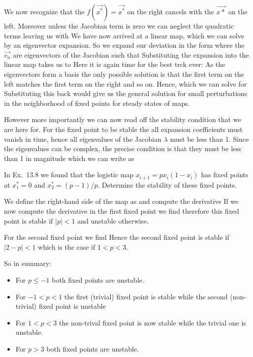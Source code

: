 We now recognize that the $f(\vec{x^*})=\vec{x^*}$ on the right cancels with the $\vec{x*}$ on the left. Moreover unless the Jacobian term is zero we can neglect the quadratic terms leaving us with  
We have now arrived at a linear map, which we can solve by an eigenvector expansion. So we expand our deviation in the form 
where the $\vec{v_n}$ are eigenvectors of the Jacobian such that 
Substituting the expansion into the linear map takes us to 
Here it is again time for the best trck ever: As the eigenvectors form a basis the only possible solution is that the first term on the left matches the first term on the right and so on. Hence,
which we can solve for 
Substituting this back would give us the general solution for small perturbations in the neighborhood of fixed points for steady states of maps. 

However more importantly we can now read off the stability condition that we are here for. For the fixed point to be stable the all expansion coefficients must vanish in time, hence all eigenvalues of the Jacobian $\lambda$ must be less than 1. Since the eigenvalues can be complex, the precise condition is that they must be less than 1 in magnitude which we can write as 

\subquestion
In Ex.~13.8 we found that the logistic map $x_{i+1}=px_i(1-x_i)$ has fixed points at $x_1^*=0$ and $x_2^*=(p-1)/p$. Determine the stability of these fixed points. 

\solution 
We define the right-hand side of the map as 
and compute the derivative 
If we now compute the derivative in the first fixed point we find
therefore this fixed point is stable if $|p|<1$ and unstable otherwise. 

For the second fixed point we find
Hence the second fixed point is stable if $|2-p|<1$ which is the case if 
$1<p<3$.

So in summary: 
\begin{itemize}
  \item For $p\leq -1$ both fixed points are unstable.
  \item For $-1<p<1$ the first (trivial) fixed point is stable while the second (non-trivial) fixed point is unstable 
  \item For $1<p<3$ the non-trival fixed point is now stable while the trivial one is unstable.
  \item  For $p>3$ both fixed points are unstable. 
\end{itemize}

